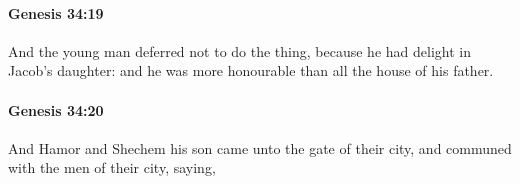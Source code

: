 		\paragraph{Genesis 34:19} %
			\label{GENESIS-34-19}

			And the young man deferred not to do the thing, because he had delight in Jacob's daughter: and he was more honourable than all the house of his father.


		\paragraph{Genesis 34:20} %
			\label{GENESIS-34-20}

			And Hamor and Shechem his son came unto the gate of their city, and communed with the men of their city, saying,


